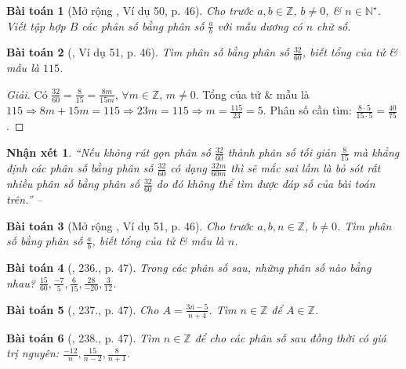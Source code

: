 \documentclass{article}
\newtheorem{baitoan}{Bài toán}
\newtheorem{nhanxet}{Nhận xét}
\begin{document}
\begin{baitoan}[Mở rộng \cite{Tuyen_Toan_6}, Ví dụ 50, p. 46]
	Cho trước $a,b\in\mathbb{Z}$, $b\ne0$, \& $n\in\mathbb{N}^\star$. Viết tập hợp $B$ các phân số bằng phân số $\frac{a}{b}$ với mẫu dương có $n$ chữ số.
\end{baitoan}

\begin{baitoan}[\cite{Tuyen_Toan_6}, Ví dụ 51, p. 46]
	Tìm phân số bằng phân số $\frac{32}{60}$, biết tổng của tử \& mẫu là $115$.
\end{baitoan}	

\begin{proof}[Giải]
	Có $\frac{32}{60} = \frac{8}{15} = \frac{8m}{15m}$, $\forall m\in\mathbb{Z}$, $m\ne0$. Tổng của tử \& mẫu là $115\Rightarrow8m + 15m = 115\Rightarrow23m = 115\Rightarrow m =\frac{115}{23} = 5$. Phân số cần tìm: $\frac{8\cdot5}{15\cdot5} = \frac{40}{75}$.
\end{proof}

\begin{nhanxet}
	``Nếu không rút gọn phân số $\frac{32}{60}$ thành phân số tối giản $\frac{8}{15}$ mà khẳng định các phân số bằng phân số $\frac{32}{60}$ có dạng $\frac{32m}{60m}$ thì sẽ mắc sai lầm là bỏ sót rất nhiều phân số bằng phân số $\frac{32}{60}$ do đó không thể tìm được đáp số của bài toán trên.'' -- \cite[p. 46]{Tuyen_Toan_6}
\end{nhanxet}

\begin{baitoan}[Mở rộng \cite{Tuyen_Toan_6}, Ví dụ 51, p. 46]
	Cho trước $a,b,n\in\mathbb{Z}$, $b\ne0$. Tìm phân số bằng phân số $\frac{a}{b}$, biết tổng của tử \& mẫu là $n$.
\end{baitoan}

\begin{baitoan}[\cite{Tuyen_Toan_6}, 236., p. 47]
	Trong các phân số sau, những phân số nào bằng nhau? $\frac{15}{60},\frac{-7}{5},\frac{6}{15},\frac{28}{-20},\frac{3}{12}$.
\end{baitoan}

\begin{baitoan}[\cite{Tuyen_Toan_6}, 237., p. 47]
	Cho $A = \frac{3n - 5}{n + 4}$. Tìm $n\in\mathbb{Z}$ để $A\in\mathbb{Z}$.
\end{baitoan}

\begin{baitoan}[\cite{Tuyen_Toan_6}, 238., p. 47]
	Tìm $n\in\mathbb{Z}$ để cho các phân số sau đồng thời có giá trị nguyên: $\frac{-12}{n},\frac{15}{n - 2},\frac{8}{n + 1}$.
\end{baitoan}
\end{document}
